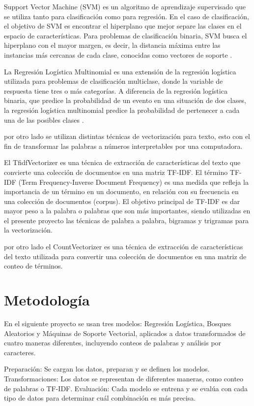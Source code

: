 \documentclass[a4paper,12pt]{article}
\begin{document}
Support Vector Machine (SVM) es un algoritmo de aprendizaje supervisado que se utiliza tanto para clasificación como para regresión. En el caso de clasificación, el objetivo de SVM es encontrar el hiperplano que mejor separe las clases en el espacio de características. Para problemas de clasificación binaria, SVM busca el hiperplano con el mayor margen, es decir, la distancia máxima entre las instancias más cercanas de cada clase, conocidas como vectores de soporte \cite{svm}.

La Regresión Logística Multinomial es una extensión de la regresión logística utilizada para problemas de clasificación multiclase, donde la variable de respuesta tiene tres o más categorías. A diferencia de la regresión logística binaria, que predice la probabilidad de un evento en una situación de dos clases, la regresión logística multinomial predice la probabilidad de pertenecer a cada una de las posibles clases \cite{lr}.

por otro lado se utilizan distintas técnicas de vectorización para texto, esto con el fin de transformar las palabras a números interpretables por una computadora.

El TfidfVectorizer es una técnica de extracción de características del texto que convierte una colección de documentos en una matriz TF-IDF. El término TF-IDF (Term Frequency-Inverse Document Frequency) es una medida que refleja la importancia de un término en un documento, en relación con su frecuencia en una colección de documentos (corpus). El objetivo principal de TF-IDF es dar mayor peso a la palabra o palabras que son más importantes\cite{tdf}, siendo utilizadas en el presente proyecto las técnicas de palabra a palabra,  bigramas y trigramas para la vectorización.

por otro lado el CountVectorizer es una técnica de extracción de características del texto utilizada para convertir una colección de documentos en una matriz de conteo de términos.

\section{Metodología}

En el siguiente proyecto se usan tres modelos: Regresión Logística, Bosques Aleatorios y Máquinas de Soporte Vectorial, aplicados a datos transformados de cuatro maneras diferentes, incluyendo conteos de palabras y análisis por caracteres.

Preparación: Se cargan los datos, preparan y se definen los modelos.
Transformaciones: Los datos se representan de diferentes maneras, como conteo de palabras o TF-IDF.
Evaluación: Cada modelo se entrena y se evalúa con cada tipo de datos para determinar cuál combinación es más precisa.
\end{document}
